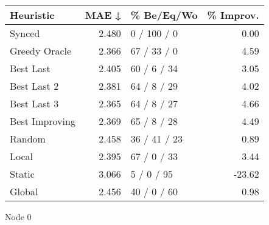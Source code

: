 \begin{tabular}{lrlr}
\toprule
\textbf{Heuristic} & \textbf{MAE ↓} & \textbf{\% Be/Eq/Wo} & \textbf{\% Improv.} \\
\midrule
            Synced &          2.480 &          0 / 100 / 0 &                0.00 \\
     Greedy Oracle &          2.366 &          67 / 33 / 0 &                4.59 \\
         Best Last &          2.405 &          60 / 6 / 34 &                3.05 \\
       Best Last 2 &          2.381 &          64 / 8 / 29 &                4.02 \\
       Best Last 3 &          2.365 &          64 / 8 / 27 &                4.66 \\
    Best Improving &          2.369 &          65 / 8 / 28 &                4.49 \\
            Random &          2.458 &         36 / 41 / 23 &                0.89 \\
             Local &          2.395 &          67 / 0 / 33 &                3.44 \\
            Static &          3.066 &           5 / 0 / 95 &              -23.62 \\
            Global &          2.456 &          40 / 0 / 60 &                0.98 \\
\bottomrule
\end{tabular}
\caption{Node 0}
\label{tab:ds_non_lr05_le1_bs4_0}
